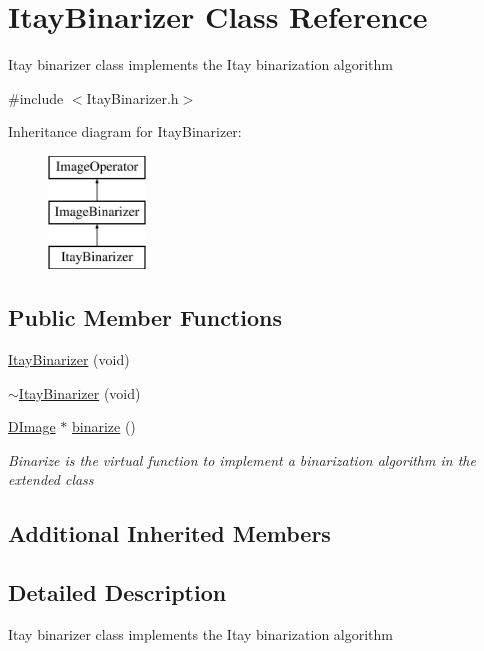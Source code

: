 \hypertarget{class_itay_binarizer}{\section{Itay\+Binarizer Class Reference}
\label{class_itay_binarizer}
}


Itay binarizer class implements the Itay binarization algorithm  




{\ttfamily \#include $<$Itay\+Binarizer.\+h$>$}

Inheritance diagram for Itay\+Binarizer\+:\begin{figure}[H]
\begin{center}
\leavevmode
\includegraphics[height=3.000000cm]{class_itay_binarizer}
\end{center}
\end{figure}
\subsection*{Public Member Functions}
\begin{DoxyCompactItemize}
\item 
\hyperlink{class_itay_binarizer_acdebbcdfb59f5d226d85aafe9eefd0de}{Itay\+Binarizer} (void)
\item 
\hyperlink{class_itay_binarizer_ab4d858630f5efb4ee0506fe5b53d6629}{$\sim$\+Itay\+Binarizer} (void)
\item 
\hyperlink{class_d_image}{D\+Image} $\ast$ \hyperlink{class_itay_binarizer_ad0093e357fe07cc4b42dcc2f0f416832}{binarize} ()
\begin{DoxyCompactList}\small\item\em Binarize is the virtual function to implement a binarization algorithm in the extended class \end{DoxyCompactList}\end{DoxyCompactItemize}
\subsection*{Additional Inherited Members}


\subsection{Detailed Description}
Itay binarizer class implements the Itay binarization algorithm 

